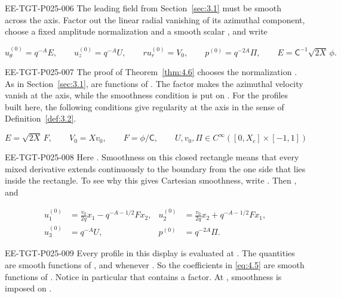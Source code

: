 \begin{EESegment}{EE-TGT-P025-006}
The leading field from Section~\ref{sec:3.1} must be smooth across the axis.
Factor out the linear radial vanishing of its azimuthal component, choose a fixed amplitude normalization
 and a smooth scalar
, and write
\end{EESegment}
\begin{equation}
 u_\theta^{(0)}=q^{-A}E,\qquad
 u_z^{(0)}=q^{-A}U,\qquad
 ru_r^{(0)}=V_0,\qquad
 p^{(0)}=q^{-2A}\Pi,\qquad
 E=\mathsf C^{-1}\sqrt{2X}\,\phi.
\tag{4.3}\label{eq:4.3}
\end{equation}
\begin{EESegment}{EE-TGT-P025-007}
The proof of Theorem~\ref{thm:4.6} chooses the normalization
. As in Section~\ref{sec:3.1},
 are functions of
. The factor
 makes the azimuthal velocity vanish at the
axis, while the smoothness condition is put on
. For the profiles built here, the following
conditions give regularity at the axis in the sense of
Definition~\ref{def:3.2}.
\end{EESegment}
\begin{equation}
 E=\sqrt{2X}\,F,\qquad V_0=Xv_0,\qquad
 F=\phi/\mathsf C,\qquad
 U,v_0,\Pi\in C^\infty([0,X_c]\times[-1,1])
\tag{4.4}\label{eq:4.4}
\end{equation}
\begin{EESegment}{EE-TGT-P025-008}
Here . Smoothness on this closed rectangle means
that every mixed  derivative extends continuously
to the boundary from the one side that lies inside the rectangle. To see why
this gives Cartesian smoothness, write
. Then
, and
\end{EESegment}
\begin{equation}
\begin{aligned}
 u_1^{(0)}&=\frac{v_0}{2q}x_1-q^{-A-1/2}Fx_2,
 &u_2^{(0)}&=\frac{v_0}{2q}x_2+q^{-A-1/2}Fx_1,\\
 u_3^{(0)}&=q^{-A}U,
 &p^{(0)}&=q^{-2A}\Pi.
\end{aligned}
\tag{4.5}\label{eq:4.5}
\end{equation}
\begin{EESegment}{EE-TGT-P025-009}
Every profile in this display is evaluated at
. The quantities
 are smooth functions of
, and  whenever
. So the coefficients in \eqref{eq:4.5} are
smooth functions of . Notice in particular
that  contains a
 factor. At
, smoothness is imposed on
.
\end{EESegment}

